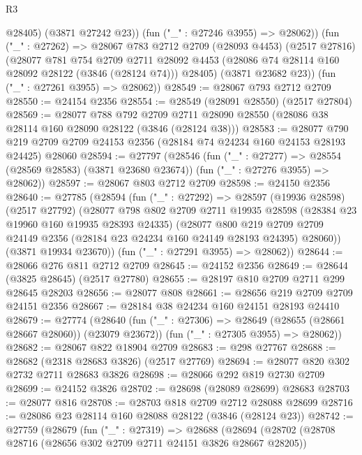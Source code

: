 \begin{lexlean}{R3}
\begin{coremodule}
            @28405)
          (@3871 @27242 @23))
        (fun ("_" : @27246 @3955) => @28062))
      (fun ("_" : @27262) =>
      @28067
        @783
        @2712
        @2709
        (@28093 @4453)
        (@2517 @27816)
        (@28077
          @781
          @754
          @2709
          @2711
          @28092
          @4453
          (@28086 @74 @28114 @160 @28092 @28122 (@3846 (@28124 @74)))
          @28405)
        (@3871 @23682 @23))
      (fun ("_" : @27261 @3955) => @28062))
@28549 := @28067 @793 @2712 @2709
@28550 := @24154 @2356
@28554 := @28549 (@28091 @28550) (@2517 @27804)
@28569 := @28077
    @788
    @792
    @2709
    @2711
    @28090
    @28550
    (@28086 @38 @28114 @160 @28090 @28122 (@3846 (@28124 @38)))
@28583 := @28077
    @790
    @219
    @2709
    @2709
    @24153
    @2356
    (@28184 @74 @24234 @160 @24153 @28193 @24425)
    @28060
@28594 := @27797
    (@28546
      (fun ("_" : @27277) => @28554 (@28569 @28583) (@3871 @23680 @23674))
      (fun ("_" : @27276 @3955) => @28062))
@28597 := @28067 @803 @2712 @2709
@28598 := @24150 @2356
@28640 := @27785
    (@28594
      (fun ("_" : @27292) =>
      @28597
        (@19936 @28598)
        (@2517 @27792)
        (@28077
          @798
          @802
          @2709
          @2711
          @19935
          @28598
          (@28384 @23 @19960 @160 @19935 @28393 @24335)
          (@28077
            @800
            @219
            @2709
            @2709
            @24149
            @2356
            (@28184 @23 @24234 @160 @24149 @28193 @24395)
            @28060))
        (@3871 @19934 @23670))
      (fun ("_" : @27291 @3955) => @28062))
@28644 := @28066 @276 @811 @2712 @2709
@28645 := @24152 @2356
@28649 := @28644 (@3825 @28645) (@2517 @27780)
@28655 := @28197 @810 @2709 @2711 @299 @28645 @28203
@28656 := @28077 @808
@28661 := @28656 @219 @2709 @2709 @24151 @2356
@28667 := @28184 @38 @24234 @160 @24151 @28193 @24410
@28679 := @27774
    (@28640
      (fun ("_" : @27306) => @28649 (@28655 (@28661 @28667 @28060)) (@23079 @23672))
      (fun ("_" : @27305 @3955) => @28062))
@28682 := @28067 @822 @18904 @2709
@28683 := @298 @27767
@28688 := @28682 (@2318 @28683 @3826) (@2517 @27769)
@28694 := @28077 @820 @302 @2732 @2711 @28683 @3826
@28698 := @28066 @292 @819 @2730 @2709
@28699 := @24152 @3826
@28702 := @28698 (@28089 @28699) @28683
@28703 := @28077 @816
@28708 := @28703 @818 @2709 @2712 @28088 @28699
@28716 := @28086 @23 @28114 @160 @28088 @28122 (@3846 (@28124 @23))
@28742 := @27759
    (@28679
      (fun ("_" : @27319) =>
      @28688
        (@28694
          (@28702
            (@28708 @28716 (@28656 @302 @2709 @2711 @24151 @3826 @28667 @28205))

\end{coremodule}
\end{lexlean}

